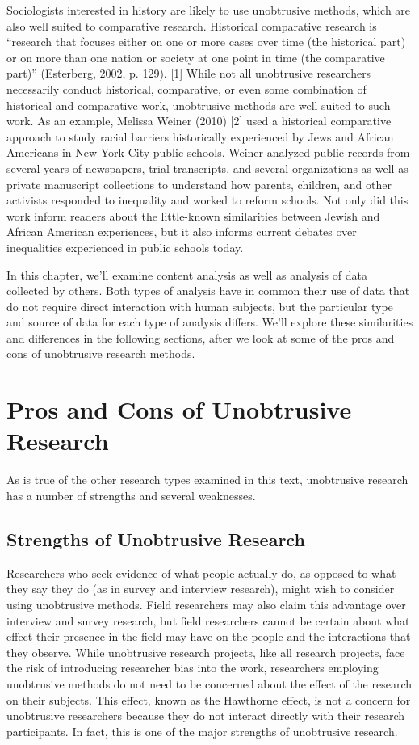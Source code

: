 Sociologists interested in history are likely to use unobtrusive methods, which are also well suited to comparative research. Historical comparative research is “research that focuses either on one or more cases over time (the historical part) or on more than one nation or society at one point in time (the comparative part)” (Esterberg, 2002, p. 129). [1] While not all unobtrusive researchers necessarily conduct historical, comparative, or even some combination of historical and comparative work, unobtrusive methods are well suited to such work. As an example, Melissa Weiner (2010) [2] used a historical comparative approach to study racial barriers historically experienced by Jews and African Americans in New York City public schools. Weiner analyzed public records from several years of newspapers, trial transcripts, and several organizations as well as private manuscript collections to understand how parents, children, and other activists responded to inequality and worked to reform schools. Not only did this work inform readers about the little-known similarities between Jewish and African American experiences, but it also informs current debates over inequalities experienced in public schools today.

In this chapter, we’ll examine content analysis as well as analysis of data collected by others. Both types of analysis have in common their use of data that do not require direct interaction with human subjects, but the particular type and source of data for each type of analysis differs. We’ll explore these similarities and differences in the following sections, after we look at some of the pros and cons of unobtrusive research methods.

\section{Pros and Cons of Unobtrusive Research}

As is true of the other research types examined in this text, unobtrusive research has a number of strengths and several weaknesses.

\subsection{Strengths of Unobtrusive Research}

Researchers who seek evidence of what people actually do, as opposed to what they say they do (as in survey and interview research), might wish to consider using unobtrusive methods. Field researchers may also claim this advantage over interview and survey research, but field researchers cannot be certain about what effect their presence in the field may have on the people and the interactions that they observe. While unobtrusive research projects, like all research projects, face the risk of introducing researcher bias into the work, researchers employing unobtrusive methods do not need to be concerned about the effect of the research on their subjects. This effect, known as the Hawthorne effect, is not a concern for unobtrusive researchers because they do not interact directly with their research participants. In fact, this is one of the major strengths of unobtrusive research.


